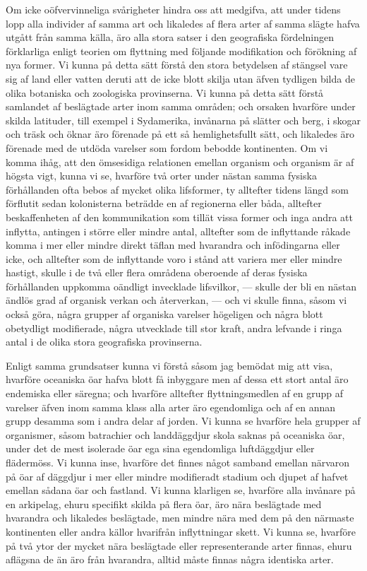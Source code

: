 Om icke oöfvervinneliga svårigheter hindra oss att medgifva, att under tidens lopp alla individer af samma art och likaledes af flera arter af samma slägte hafva utgått från samma källa, äro alla stora satser i den geografiska fördelningen förklarliga enligt teorien om flyttning med följande modifikation och förökning af nya former. Vi kunna på detta sätt förstå den stora betydelsen af stängsel vare sig af land eller vatten deruti att de icke blott skilja utan äfven tydligen bilda de olika botaniska och zoologiska provinserna. Vi kunna på detta sätt förstå samlandet af beslägtade arter inom samma områden; och orsaken hvarföre under skilda latituder, till exempel i Sydamerika, invånarna på slätter och berg, i skogar och träsk och öknar äro förenade på ett så hemlighetsfullt sätt, och likaledes äro förenade med de utdöda varelser som fordom bebodde kontinenten. Om vi komma ihåg, att den ömsesidiga relationen emellan organism och organism är af högsta vigt, kunna vi se, hvarföre två orter under nästan samma fysiska förhållanden ofta bebos af mycket olika lifsformer, ty alltefter tidens längd som förflutit sedan kolonisterna beträdde en af regionerna eller båda, alltefter beskaffenheten af den kommunikation som tillät vissa former och inga andra att inflytta, antingen i större eller mindre antal, alltefter som de inflyttande råkade komma i mer eller mindre direkt täflan med hvarandra och infödingarna eller icke, och alltefter som de inflyttande voro i stånd att variera mer eller mindre hastigt, skulle i de två eller flera områdena oberoende af deras fysiska förhållanden uppkomma oändligt invecklade lifsvilkor, — skulle der bli en nästan ändlös grad af organisk verkan och återverkan, — och vi skulle finna, såsom vi också göra, några grupper af organiska varelser högeligen och några blott obetydligt modifierade, några utvecklade till stor kraft, andra lefvande i ringa antal i de olika stora geografiska provinserna.

Enligt samma grundsatser kunna vi förstå såsom jag bemödat mig att visa, hvarföre oceaniska öar hafva blott få inbyggare men af dessa ett stort antal äro endemiska eller säregna; och hvarföre alltefter flyttningsmedlen af en grupp af varelser äfven inom samma klass alla arter äro egendomliga och af en annan grupp desamma som i andra delar af jorden. Vi kunna se hvarföre hela grupper af organismer, såsom batrachier och landdäggdjur skola saknas på oceaniska öar, under det de mest isolerade öar ega sina egendomliga luftdäggdjur eller flädermöss. Vi kunna inse, hvarföre det finnes något samband emellan närvaron på öar af däggdjur i mer eller mindre modifieradt stadium och djupet af hafvet emellan sådana öar och fastland. Vi kunna klarligen se, hvarföre alla invånare på en arkipelag, ehuru specifikt skilda på flera öar, äro nära beslägtade med hvarandra och likaledes beslägtade, men mindre nära med dem på den närmaste kontinenten eller andra källor hvarifrån inflyttningar skett. Vi kunna se, hvarföre på två ytor der mycket nära beslägtade eller representerande arter finnas, ehuru aflägsna de än äro från hvarandra, alltid måste finnas några identiska arter.

